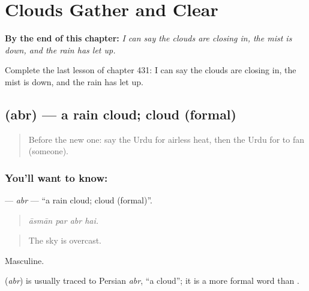 
\chapter{Clouds Gather and Clear}
\label{ch:ur-clouds-gather-and-clear}

\begin{chapteropening}
\textbf{By the end of this chapter:} \emph{I can say the clouds are closing in, the mist is down, and the rain has let up.}

Complete the last lesson of chapter 431: I can say the clouds are closing in, the mist is down, and the rain has let up.
\end{chapteropening}

\section[\texorpdfstring{\ur{ابر} (abr)}{ابر (abr)}]{ (abr) — a rain cloud; cloud (formal)}

\label{lesson:UR-C431-abr}



\begin{quote}
Before the new one: say the Urdu for airless heat, then the Urdu for to fan (someone).
\end{quote}

\subsection*{You'll want to know: }
\textbf{} — \emph{abr} — \textquotedblleft{}a rain cloud; cloud (formal)\textquotedblright{}.

\begin{quote}
   
\end{quote}

\begin{quote}
\emph{āsmān par abr hai.}
\end{quote}

\begin{quote}
The sky is overcast.
\end{quote}

Masculine.

\begin{cousinweb}
\textbf{} (\emph{abr}) is usually traced to Persian \emph{abr}, \textquotedblleft{}a cloud\textquotedblright{}; it is a more formal word than \textbf{}.
\end{cousinweb}

